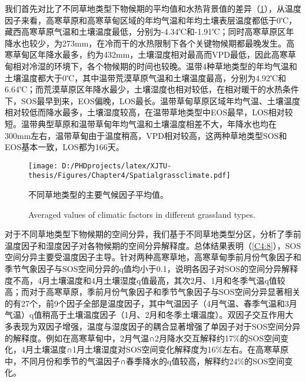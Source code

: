 
我们首先对比了不同草地类型下物候期的平均值和水热背景值的差异（\cref{C4:7}），从温度因子来看，高寒草原和高寒草甸区域的年均气温和年均土壤表层温度都低于0℃，藏西高寒草原气温和土壤温度最低，分别为-4.34℃和-1.91℃；同时高寒草原区年降水也较少，为273mm，在冷而干的水热限制下各个关键物候期都最晚发生。高寒草甸区年降水最多，约为432mm，土壤湿度相对最高而VPD最低，因此高寒草甸相对冷湿的环境下，各个物候期的时间也较晚。温带4种草地类型的年均气温和土壤温度都大于0℃，其中温带荒漠草原气温和土壤温度最高，分别为4.92℃和6.64℃；而荒漠草原区年降水最少，土壤湿度也相对较低，在相对暖干的水热条件下，SOS最早到来，EOS偏晚，LOS最长。温带草甸草原区域年均气温、土壤温度相对较低而降水最多，土壤湿度较高，在温带草地类型中EOS最早，LOS相对较短。温带典型草原和温带草甸年均气温和土壤温度相差不大，年降水也均在300mm左右，温带草甸由于温度稍高，VPD相对较高，这两种草地类型SOS和EOS基本一致，LOS都为166天。

\renewcommand{\dblfloatpagefraction}{.8}
\begin{figure}[H]
  \centering
  \vspace{-0.1cm}
  \setlength\abovedisplayskip{0pt}
  \texttt{[image: D:/PHDprojects/latex/XJTU-thesis/Figures/Chapter4/Spatialgrassclimate.pdf]}
  \caption{不同草地类型的主要气候因子平均值。}
  \addtocounter{figure}{-1}
  \vspace{5pt}
  \renewcommand{\figurename}{Fig}
  \caption{Averaged values of climatic factors in different grassland types. }
  \label{C4:7}
\end{figure}

对于不同草地类型下物候期的空间分异，我们基于不同草地类型分区，分析了季前温度因子和湿度因子对各物候期的空间分异解释度。总体结果表明（\cref{C4:8}），SOS空间分异主要受温度因子主导。针对两种高寒草地，高寒草甸季前月份气象因子和季节气象因子与SOS空间分异的q值均小于0.1，说明各因子对SOS的空间分异解释度不高，4月土壤温度和4月土壤湿度q值最高，其次2月、1月和冬季气温q值较高；而对于高寒草原，季前月份气象因子和季节气象因子与SOS空间分异显著相关的有27个，前9个因子全部是温度因子，其中气温因子（4月气温、春季气温和3月气温）q值稍高于土壤温度因子（1月、2月和冬季土壤温度）。双因子交互作用大多表现为双因子增强，温度与湿度因子的耦合显著增强了单因子对于SOS空间分异的解释度。例如在高寒草甸中，2月气温∩2月降水交互解释约17\%的SOS空间变化，4月土壤温度∩1月土壤湿度对SOS空间变化解释度为16\%左右。在高寒草原中，不同月份和季节的气温因子∩春季降水的q值较高，解释约24\%的SOS空间变化。

